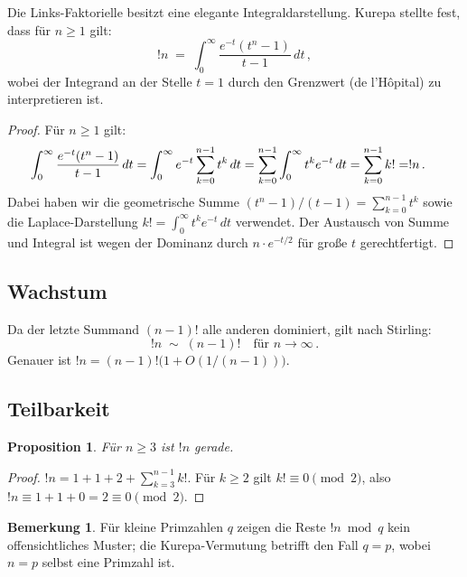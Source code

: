 \documentclass[12pt,a4paper]{amsart}
\newtheorem{proposition}[theorem]{Proposition}
\theoremstyle{definition}
\newtheorem{bemerkung}[theorem]{Bemerkung}
\begin{document}
Die Links-Faktori\-elle besitzt eine elegante Integraldarstellung.
Kurepa stellte fest, dass für $n \geq 1$ gilt:
\begin{equation}\label{eq:integral}
  !n \;=\; \int_0^{\infty} \frac{e^{-t}(t^n - 1)}{t - 1}\,dt\,,
\end{equation}
wobei der Integrand an der Stelle $t = 1$ durch den Grenzwert
(de l'H\^{o}pital) zu interpretieren ist.

\begin{proof}
Für $n \geq 1$ gilt:
\begin{align*}
  \int_0^{\infty} \frac{e^{-t}(t^n - 1)}{t - 1}\,dt
  &= \int_0^{\infty} e^{-t} \sum_{k=0}^{n-1} t^k \,dt
  = \sum_{k=0}^{n-1} \int_0^{\infty} t^k e^{-t}\,dt
  = \sum_{k=0}^{n-1} k! = !n\,. \qedhere
\end{align*}
Dabei haben wir die geometrische Summe
$(t^n - 1)/(t-1) = \sum_{k=0}^{n-1} t^k$ sowie die Laplace-Darstellung
$k! = \int_0^\infty t^k e^{-t}\,dt$ verwendet.
Der Austausch von Summe und Integral ist wegen der Dominanz durch
$n \cdot e^{-t/2}$ für große $t$ gerechtfertigt.
\end{proof}

\subsection{Wachstum}

Da der letzte Summand $(n-1)!$ alle anderen dominiert, gilt nach Stirling:
\[
  !n \;\sim\; (n-1)! \quad \text{für } n \to \infty\,.
\]
Genauer ist $!n = (n-1)!\bigl(1 + O(1/(n-1))\bigr)$.

\subsection{Teilbarkeit}

\begin{proposition}
Für $n \geq 3$ ist $!n$ gerade.
\end{proposition}
\begin{proof}
$!n = 1 + 1 + 2 + \sum_{k=3}^{n-1} k!$.
Für $k \geq 2$ gilt $k! \equiv 0 \pmod{2}$, also
$!n \equiv 1 + 1 + 0 = 2 \equiv 0 \pmod{2}$.
\end{proof}

\begin{bemerkung}
Für kleine Primzahlen $q$ zeigen die Reste $!n \bmod q$ kein offensichtliches
Muster; die Kurepa-Vermutung betrifft den Fall $q = p$, wobei $n = p$ selbst
eine Primzahl ist.
\end{bemerkung}
\end{document}
